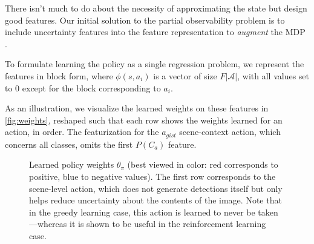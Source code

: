 There isn't much to do about the necessity of approximating the state but design good features.
Our initial solution to the partial observability problem is to include uncertainty features into the feature representation to \emph{augment} the MDP \cite{Kwok2004}.

To formulate learning the policy as a single regression problem, we represent the features in block form, where $\phi(s,a_i)$ is a vector of size $F|\mathcal{A}|$, with all values set to $0$ except for the block corresponding to $a_i$.

As an illustration, we visualize the learned weights on these features in \autoref{fig:weights}, reshaped such that each row shows the weights learned for an action, in order.
The featurization for the $a_{gist}$ scene-context action, which concerns all classes, omits the first $P(C_a)$ feature.

\begin{figure}[h!]
\centering
{}
\caption{
Learned policy weights $\theta_\pi$ (best viewed in color: red corresponds to positive, blue to negative values).
The first row corresponds to the scene-level action, which does not generate detections itself but only helps reduce uncertainty about the contents of the image.
Note that in the greedy learning case, this action is learned to never be taken---whereas it is shown to be useful in the reinforcement learning case.
}
\label{fig:weights}
\end{figure}

